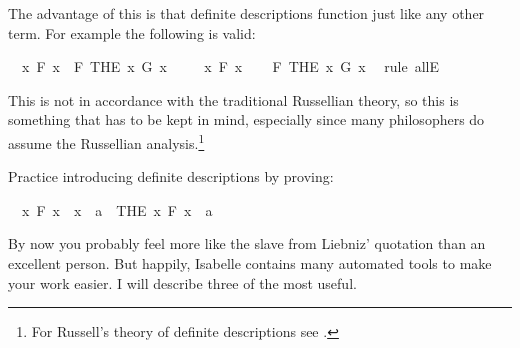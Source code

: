\begin{isabellebody}
\begin{isamarkuptext}
The advantage of this is that definite descriptions function just like any other term. For
example the following is valid:%
\end{isamarkuptext}\isamarkuptrue%
\isamarkupfalse%
\ {\isachardoublequoteopen}{\isacharparenleft}{\isasymforall}\ x{\isachardot}\ F\ x{\isacharparenright}\ {\isasymlongrightarrow}\ F\ {\isacharparenleft}THE\ x{\isachardot}\ G\ x{\isacharparenright}{\isachardoublequoteclose}\isanewline
%
\isadelimproof
%
\endisadelimproof
%
\isatagproof
{}\isamarkupfalse%
\isanewline
\ \ \isamarkupfalse%
\ {\isachardoublequoteopen}{\isasymforall}\ x{\isachardot}\ F\ x{\isachardoublequoteclose}\isanewline
\ \ \isamarkupfalse%
\ {\isachardoublequoteopen}F\ {\isacharparenleft}THE\ x{\isachardot}\ G\ x{\isacharparenright}{\isachardoublequoteclose}\ \isamarkupfalse%
\ {\isacharparenleft}rule\ allE{\isacharparenright}\isanewline
{}\isamarkupfalse%
%
\endisatagproof
{\isafoldproof}%
%
\isadelimproof
%
\endisadelimproof
%
\begin{isamarkuptext}%
This is not in accordance with the traditional Russellian theory, so this is something that
has to be kept in mind, especially since many philosophers do assume the Russellian analysis.\footnote{
For Russell's theory of definite descriptions see \cite{russell_denoting_1905}.}%
\end{isamarkuptext}\isamarkuptrue%
%
\begin{isamarkuptext}%
\begin{Exercise} Practice introducing definite descriptions by proving: \end{Exercise}%
\end{isamarkuptext}\isamarkuptrue%
\isamarkupfalse%
\ {\isachardoublequoteopen}{\isacharparenleft}{\isasymforall}\ x{\isachardot}\ F\ x\ {\isasymlongleftrightarrow}\ x\ {\isacharequal}\ a{\isacharparenright}\ {\isasymlongrightarrow}\ {\isacharparenleft}THE\ x{\isachardot}\ F\ x{\isacharparenright}\ {\isacharequal}\ a{\isachardoublequoteclose}%
\isadelimproof
\ %
\endisadelimproof
%
\isatagproof
{}\isamarkupfalse%
%
\endisatagproof
{\isafoldproof}%
%
\isadelimproof
%
\endisadelimproof
%
\isamarkuptrue%
%
\begin{isamarkuptext}%
By now you probably feel more like the slave from Liebniz' quotation than an excellent person.
But happily, Isabelle contains many automated tools to make your work easier. I will describe three of
the most useful.%

\end{isamarkuptext}
\end{isabellebody}
